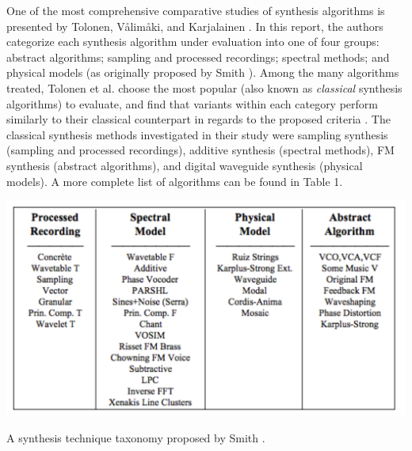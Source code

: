 \documentclass[12pt]{report} 	%
\numberwithin{figure}{chapter}
\numberwithin{table}{chapter}
\numberwithin{equation}{chapter}
\begin{document}
\begin{flushleft}
One of the most comprehensive comparative studies of synthesis algorithms is presented by Tolonen, V\aa lim\aa ki, and Karjalainen \cite{Tolonen:1998bh}. In this report, the authors categorize each synthesis algorithm under evaluation into one of four groups: abstract algorithms; sampling and processed recordings; spectral methods; and physical models (as originally proposed by Smith \cite{III:1991hc}). Among the many algorithms treated, Tolonen et al. choose the most popular (also known as \textit{classical} synthesis algorithms) to evaluate, and find that variants within each category perform similarly to their classical counterpart in regards to the proposed criteria \cite[p. 101]{Tolonen:1998bh}. The classical synthesis methods investigated in their study were sampling synthesis (sampling and processed recordings), additive synthesis (spectral methods), FM synthesis (abstract algorithms), and digital waveguide synthesis (physical models). A more complete list of algorithms can be found in Table 1.
\begin{table}[h!]
\begin{center}
\includegraphics[scale=0.7]{SynthesisTechniqueTaxonomy}
\caption[Synthesis technique taxonomy]{A synthesis technique taxonomy proposed by Smith \protect\cite{III:1991hc}.}
\end{center}
\end{table}


\end{flushleft}
\end{document}
